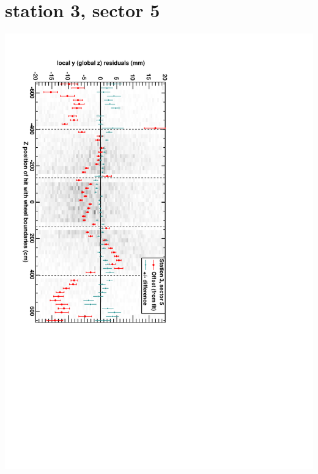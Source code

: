 \documentclass[compress]{beamer}
\begin{document}
\section*{station 3, sector 5}
\begin{frame} \vfill \mbox{\hspace{-1 cm}\includegraphics[height=1.2\linewidth, angle=90]{DTzVsZ_st3_sr05.pdf}} \end{frame}
\end{document}
